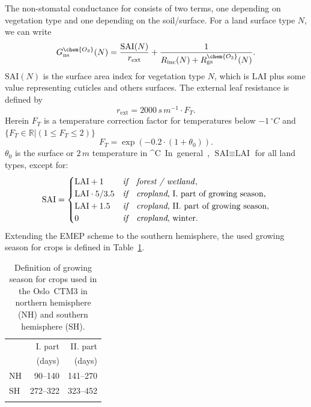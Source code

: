 \documentclass[gmd, manuscript]{copernicus}
\begin{document}
The non-stomatal conductance for  consists of two terms, one depending on vegetation type and one depending on the soil/surface. For a land surface type $N$, we can write
\begin{equation}
  G_\text{ns}^\chem{O_3}(N) = \frac{\text{SAI}(N)}{r_\text{ext}} + \frac{1}{R_\text{inc}(N) + R_\text{gs}^\chem{O_3}(N)}.
  \label{eq:non-stomata-cond}
\end{equation}
$\text{SAI}(N)$ is the surface area index for vegetation type $N$, which is $\text{LAI}$ plus some value representing cuticles and others surfaces. The external leaf resistance is defined by
\begin{equation}
  r_\text{ext} = 2000\,\unit{s\,m^{-1}}\cdot F_T.
\end{equation}
Herein $F_T$ is a temperature correction factor for temperatures below $-1\,\unit{^\circ C}$ and $\{F_T \in \mathbb{R} | (1 \leq F_T \leq 2)\}$
\begin{equation}
  F_T = \exp{(-0.2\cdot(1+\theta_0))}.
\end{equation}
$\theta_0$ is the surface or $2\,\unit{m}$ temperature in \unit{^\circ C}. In general, $\text{SAI} \equiv \text{LAI}$ for all land types, except for: 
%
\begin{equation}
  \text{SAI} = 
  \begin{cases}
    \text{LAI}+1 & \emph{if} \quad \text{\emph{forest / wetland}},\\
    \text{LAI}\cdot 5/3.5 & \emph{if} \quad \text{\emph{cropland}, I. part of growing season},\\
    \text{LAI} + 1.5 & \emph{if} \quad \text{\emph{cropland}, II. part of growing season},\\
    0 & \emph{if} \quad \text{\emph{cropland}, winter}.
  \end{cases}
  \label{eq:SAI}
\end{equation}
%
Extending the EMEP scheme to the southern hemisphere, the used growing season for crops is defined in Table~\ref{tab:growing_season}.
%
\begin{table}[t]
  \caption{Definition of growing season for crops used in the Oslo~CTM3 in northern hemisphere (NH) and southern hemisphere (SH).}
  \begin{tabular}{lrr}
    \tophline
    & I. part & II. part \\
    & (days) & (days) \\
    \middlehline
    NH & 90--140 & 141--270 \\
    SH & 272--322 & 323--452 \\
    \bottomhline
  \end{tabular}
  \label{tab:growing_season}
\end{table}
%
\end{document}
